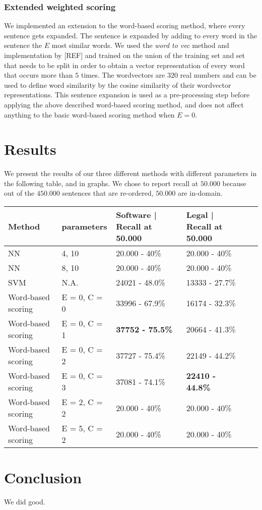 \documentclass[11pt]{article}
\begin{document}
\subsubsection{Extended weighted scoring}
We implemented an extension to the word-based scoring method, where every sentence gets expanded. The sentence is expanded by adding to every word in the sentence the $E$ most similar words. We used the \textit{word to vec} method and implementation by [REF] and trained on the union of the training set and set that needs to be split in order to obtain a vector representation of every word that occurs more than $5$ times. The wordvectors are $320$ real numbers and can be used to define word similarity by the cosine similarity of their wordvector representations. 
This sentence expansion is used as a pre-processing step before applying the above described word-based scoring method, and does not affect anything to the basic word-based scoring method when $E = 0$.

\section{Results}
\label{sec:results}
We present the results of our three different methods with different parameters in the following table, and in graphs. We chose to report recall at $50.000$ because out of the $450.000$ sentences that are re-ordered, $50.000$ are in-domain. 

\begin{table}[H]
    \begin{tabular}{|l|l|l|l|l|l|}
    \hline
    Method & parameters & Software | Recall at 50.000  & Legal | Recall at 50.000 \\ \hline
    NN      & 4, 10          & 20.000 - 40\%  & 20.000 - 40\%        \\ \hline
    NN      & 8, 10          & 20.000 - 40\%  & 20.000 - 40\%        \\ \hline
    SVM      & N.A.          & 24021 - 48.0\%  & 13333 - 27.7\%        \\ \hline
    Word-based scoring  & E = 0, C = 0 & 33996 - 67.9\%  & 16174 - 32.3\%        \\ \hline
    Word-based scoring  & E = 0, C = 1 & \textbf{37752 - 75.5\%}  & 20664 - 41.3\%        \\ \hline
    Word-based scoring  & E = 0, C = 2 & 37727 - 75.4\%  & 22149 - 44.2\%        \\ \hline
    Word-based scoring  & E = 0, C = 3 & 37081 - 74.1\%  & \textbf{22410 - 44.8\%}        \\ \hline
    Word-based scoring  & E = 2, C = 2 & 20.000 - 40\%  & 20.000 - 40\%        \\ \hline
    Word-based scoring  & E = 5, C = 2 & 20.000 - 40\%  & 20.000 - 40\%        \\ \hline
    \end{tabular}
\end{table}





\section{Conclusion}
\label{sec:conclusion}
We did good.




\end{document}
